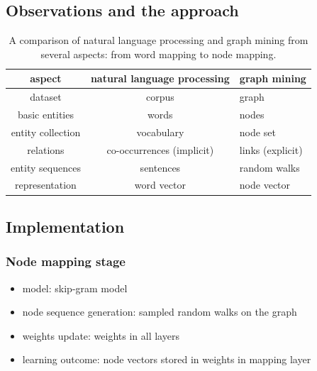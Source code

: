 \documentclass{article}
\begin{document}
\subsection{Observations and the approach}
\begin{table}[H]
	\centering
	\begin{tabularx}{\textwidth}{ |c|c|X| } \hline
		aspect  & natural language processing & graph mining \\ \hline
		dataset & corpus & graph \\ \hline
		basic entities & words & nodes \\ \hline
		entity collection & vocabulary & node set \\ \hline
		relations & co-occurrences (implicit) & links (explicit) \\ \hline
		entity sequences & sentences & random walks \\ \hline
		representation & word vector & node vector \\ \hline
	\end{tabularx}
	\caption{A comparison of natural language processing and graph mining from 
	several aspects: from word mapping to node mapping.}
	\label{tab:wordVSnode}
\end{table}

\subsection{Implementation}

\subsubsection{Node mapping stage}
\begin{itemize}
	\item model: skip-gram model
	\item node sequence generation: sampled random walks on the graph
	\item weights update: weights in all layers
	\item learning outcome: node vectors stored in weights in mapping layer
\end{itemize}
\end{document}
